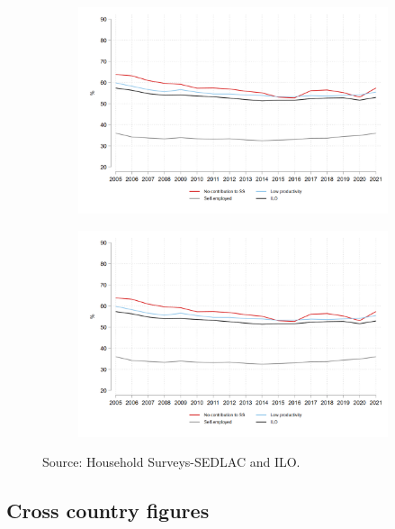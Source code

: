 \documentclass[english]{article}
\begin{document}
\begin{figure}[!htb]
\centering
  \caption{Evolution of alternative informality related measures}
\begin{subfigure}{.5\textwidth}
  \centering
  \includegraphics[width=1\linewidth]{latex/figures/Series/LAC_ipo_fig1.png}
  \label{fig:sub1}
\end{subfigure}%
\begin{subfigure}{.5\textwidth}
  \centering
  \includegraphics[width=1\linewidth]{latex/figures/Series/LAC_ipo_fig1.png}
  \label{fig:sub2}
\end{subfigure}
\label{fig:test}
\footnotesize{Source: Household Surveys-SEDLAC and ILO.}

\end{figure}


\subsection{Cross country figures}
\end{document}
